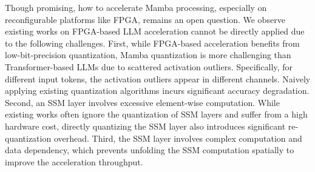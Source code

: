 Though promising, how to accelerate Mamba processing, especially on reconfigurable platforms like FPGA, remains
an open question. We observe existing works on FPGA-based LLM acceleration \cite{Flightllm,DFX} cannot be directly applied
due to the following challenges. 
First, while FPGA-based acceleration benefits from low-bit-precision quantization,
Mamba quantization is more challenging than Transformer-based LLMs due to scattered activation outliers. 
Specifically, for different input tokens, the activation outliers appear in different channels.
Naively applying existing quantization algorithms \cite{xiao2023smoothquant,wei2022outlier,wei2023outlier} incurs significant accuracy degradation.
Second, an SSM layer involves excessive element-wise computation.
While existing works \cite{li2024evaluating,pierro2024mamba,li2024marca} often ignore the quantization of SSM layers
and suffer from a high hardware cost, directly quantizing the SSM layer also introduces significant re-quantization
overhead. Third, the SSM layer involves complex computation and data dependency, which prevents unfolding the SSM
computation spatially to improve the acceleration throughput.

